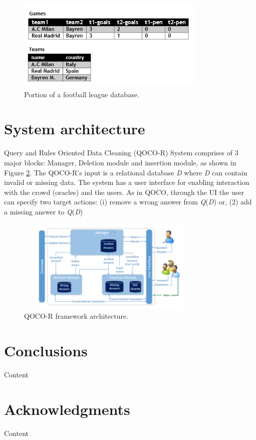 \documentclass{vldb}
\begin{document}
\begin{figure}
\centering
\includegraphics[width=9cm, height=4.5cm]{figure1}
\caption{Portion of a football league database.}
\label{fig:db}
\end{figure}

\section{System architecture}
Query and Rules Oriented Data Cleaning (QOCO-R) System comprises of 3 major blocks: Manager, Deletion module and insertion module, as shown in Figure \ref{fig:framework}.
The QOCO-R's input is a relational database \textit{D} where \textit{D} can contain invalid or missing data. The system has a user interface for enabling interaction with the crowd (oracles) and the users. As in QOCO, through the UI the user can specify two target actions: (i) remove a wrong answer from \textit{Q}(\textit{D}) or, (2) add a
missing answer to \textit{Q}(\textit{D})

\begin{figure}
\centering
\includegraphics[width=9cm, height=4.5cm]{figure2}
\caption{QOCO-R framework architecture.}
\label{fig:framework}
\end{figure}
\section{Conclusions}
Content

\section{Acknowledgments}
Content
\end{document}
